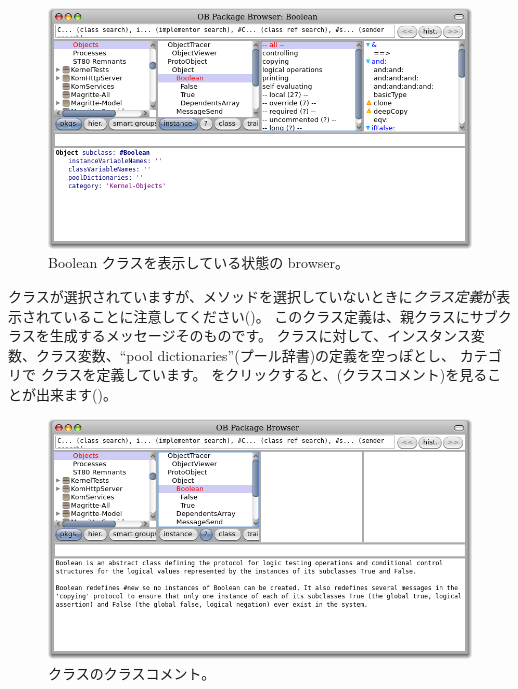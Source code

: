 \documentclass[a4paper,10pt,twoside]{book}
\begin{document}
\begin{figure}[hbt]
\centerline {\includegraphics[width=\textwidth]{Kernel-objects-boolean}}
\caption{Boolean クラスを表示している状態の browser。
}
\end{figure}

 クラスが選択されていますが、メソッドを選択していないときに\emph{クラス定義}が表示されていることに注意してください()。
このクラス定義は、親クラスにサブクラスを生成するメッセージそのものです。
 クラスに対して、インスタンス変数、クラス変数、``pool dictionaries''(プール辞書)の定義を空っぽとし、 カテゴリで  クラスを定義しています。
 をクリックすると、(クラスコメント)を見ることが出来ます()。

\begin{figure}[hbt]
\centerline {\includegraphics[width=\textwidth]{classComment}}
\caption{ クラスのクラスコメント。
}
\end{figure}
\end{document}
